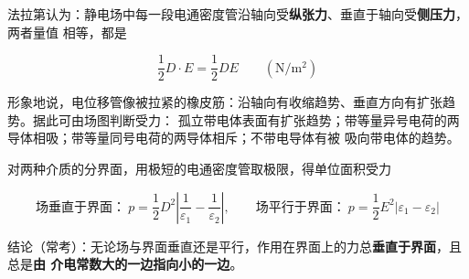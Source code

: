 法拉第认为：静电场中每一段电通密度管沿轴向受\textbf{纵张力}、垂直于轴向受\textbf{侧压力}，两者量值
相等，都是
\begin{formulaBox}
\[
\frac{1}{2}D\cdot E=\frac{1}{2}DE\qquad(\mathrm{N/m^2})
\]
\end{formulaBox}

形象地说，电位移管像被拉紧的橡皮筋：沿轴向有收缩趋势、垂直方向有扩张趋势。据此可由场图判断受力：
孤立带电体表面有扩张趋势；带等量异号电荷的两导体相吸；带等量同号电荷的两导体相斥；不带电导体有被
吸向带电体的趋势。

对两种介质的分界面，用极短的电通密度管取极限，得单位面积受力
\begin{formulaBox}
\[
\text{场垂直于界面：}\ p=\frac{1}{2}D^2\left|\frac{1}{\varepsilon_1}-\frac{1}{\varepsilon_2}\right|,
\qquad
\text{场平行于界面：}\ p=\frac{1}{2}E^2\left|\varepsilon_1-\varepsilon_2\right|
\]
\end{formulaBox}

结论（常考）：无论场与界面垂直还是平行，作用在界面上的力总\textbf{垂直于界面}，且总是\textbf{由
介电常数大的一边指向小的一边}。

